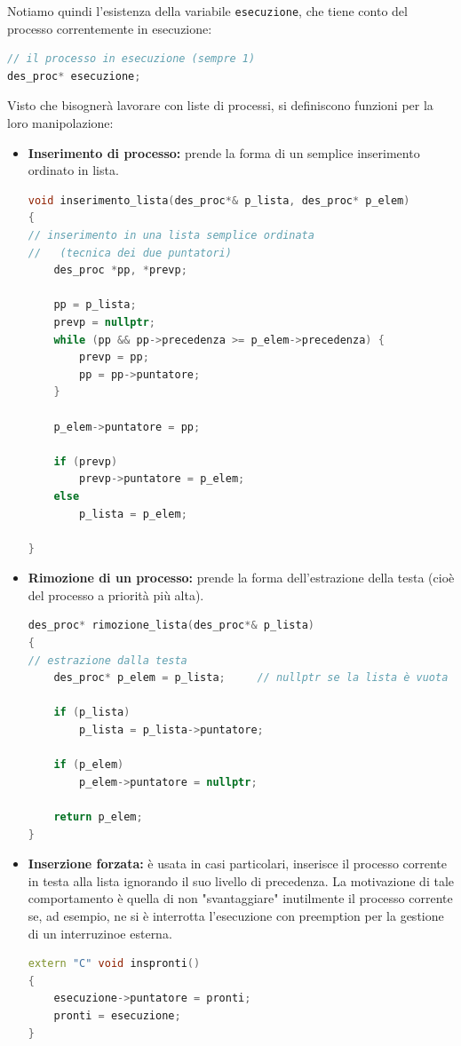 \documentclass[a4paper,11pt]{article}
\begin{document}
Notiamo quindi l'esistenza della variabile \lstinline|esecuzione|, che tiene conto del processo correntemente in esecuzione:
\begin{lstlisting}[language=C++, style=codestyle]	
// il processo in esecuzione (sempre 1)
des_proc* esecuzione;
\end{lstlisting}

Visto che bisognerà lavorare con liste di processi, si definiscono funzioni per la loro manipolazione:
\begin{itemize}
	\item \textbf{Inserimento di processo:} prende la forma di un semplice inserimento ordinato in lista.
\begin{lstlisting}[language=C++, style=codestyle]	
void inserimento_lista(des_proc*& p_lista, des_proc* p_elem)
{
// inserimento in una lista semplice ordinata
//   (tecnica dei due puntatori)
	des_proc *pp, *prevp;

	pp = p_lista;
	prevp = nullptr;
	while (pp && pp->precedenza >= p_elem->precedenza) {
		prevp = pp;
		pp = pp->puntatore;
	}

	p_elem->puntatore = pp;

	if (prevp)
		prevp->puntatore = p_elem;
	else
		p_lista = p_elem;

}
\end{lstlisting}
	\item \textbf{Rimozione di un processo:} prende la forma dell'estrazione della testa (cioè del processo a priorità più alta).
\begin{lstlisting}[language=C++, style=codestyle]	
des_proc* rimozione_lista(des_proc*& p_lista)
{
// estrazione dalla testa
	des_proc* p_elem = p_lista;  	// nullptr se la lista è vuota

	if (p_lista)
		p_lista = p_lista->puntatore;

	if (p_elem)
		p_elem->puntatore = nullptr;

	return p_elem;
}
\end{lstlisting}
\item \textbf{Inserzione forzata:} è usata in casi particolari, inserisce il processo corrente in testa alla lista ignorando il suo livello di precedenza.
	La motivazione di tale comportamento è quella di non "svantaggiare" inutilmente il processo corrente se, ad esempio, ne si è interrotta l'esecuzione con preemption per la gestione di un interruzinoe esterna.
\begin{lstlisting}[language=C++, style=codestyle]	
extern "C" void inspronti()
{
	esecuzione->puntatore = pronti;
	pronti = esecuzione;
}
\end{lstlisting}
\end{itemize}
\end{document}
